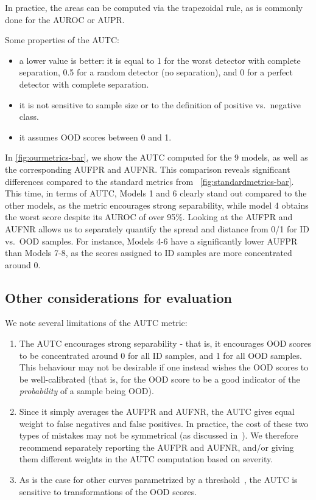 \documentclass[10pt,twocolumn,letterpaper]{article}
\begin{document}
In practice, the areas can be computed via the trapezoidal rule, as is commonly done for the AUROC or AUPR.

Some properties of the AUTC:
\begin{itemize}[itemsep=1pt,topsep=2pt,parsep=1pt]
    \item a lower value is better: it is equal to 1 for the worst detector with complete separation, 0.5 for a random detector (no separation), and 0 for a perfect detector with complete separation.
    \item it is not sensitive to sample size or to the definition of positive vs.~negative class.
    \item it assumes OOD scores between 0 and 1. 
\end{itemize}


 

In \cref{fig:ourmetrics-bar}, we show the AUTC computed for the 9 models, as well as the corresponding AUFPR and AUFNR. This comparison reveals significant differences compared to the standard metrics from ~\cref{fig:standardmetrics-bar}. This time, in terms of AUTC, Models 1 and 6 clearly stand out compared to the other models, as the metric encourages strong separability, while model 4 obtains the worst score despite its AUROC of over 95\%. Looking at the AUFPR and AUFNR allows us to separately quantify the spread and distance from 0/1 for ID vs.~OOD samples. For instance, Models 4-6 have a significantly lower AUFPR than Models 7-8, as the scores assigned to ID samples are more concentrated around 0.

\subsection{Other considerations for evaluation}

We note several limitations of the AUTC metric:
\begin{enumerate}[itemsep=2pt,topsep=2pt,parsep=1pt]
    \item The AUTC encourages strong separability - that is, it encourages OOD scores to be concentrated around 0 for all ID samples, and 1 for all OOD samples. This behaviour may not be desirable if one instead wishes the OOD scores to be well-calibrated (that is, for the OOD score to be a good indicator of the \textit{probability} of a sample being OOD).
    \item Since it simply averages the AUFPR and AUFNR, the AUTC gives equal weight to false negatives and false positives. In practice, the cost of these two types of mistakes may not be symmetrical (as discussed in~\cite{derma-ood-2022}). We therefore recommend separately reporting the AUFPR and AUFNR, and/or giving them different weights in the AUTC computation based on severity.
    \item As is the case for other curves parametrized by a threshold~\cite{reducing-network-agnostophobia-2018}, the AUTC is sensitive to transformations of the OOD scores. 
\end{enumerate}
\end{document}
